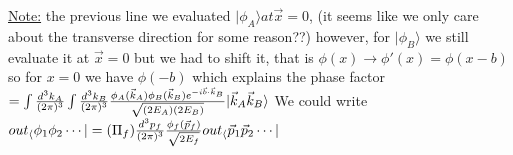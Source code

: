 \documentclass[12pt]{amsart}
\begin{document}
\begin{enumerate}
\underline{Note:} the previous line we evaluated $| \phi_A \rangle at \vec{x}=0$, (it seems like we only care about the transverse direction for some reason??) however, for $|\phi_B \rangle$ we still evaluate it at $\vec{x}=0$ but we had to shift it, that is $\phi(x) \rightarrow \phi'(x)=\phi(x-b)$ so for $x=0$ we have $\phi(-b)$ which explains the phase factor\\
$=\int \frac{d^3 k_A}{(2 \pi)^3} \int \frac{d^3 k_B}{(2 \pi)^3} \frac{\phi_A( \vec{k}_A) \phi_B( \vec{k}_B) e^{- i \vec{b} \cdot \vec{k}_B}}{\sqrt{(2 E_A)(2 E_B)}} | \vec{k}_A \vec{k}_B \rangle\\$
We could write\\
$out_\langle \phi_1 \phi_2 \cdots | = ( \Pi_f) \frac{d^3 p_f}{(2 \pi)^3} \frac{\phi_f(\vec{p}_f)}{\sqrt{2 E_f}} out_\langle \vec{p}_1 \vec{p}_2 \cdots |\\$


\hdashrule[0.5ex][c]{\linewidth}{0.5pt}{1.5mm}



\end{enumerate}
\end{document}

